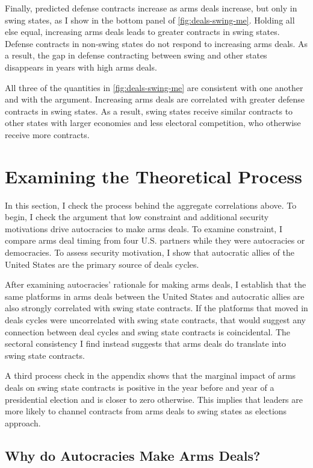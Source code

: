 \documentclass[12pt]{article}
\begin{document}
Finally, predicted defense contracts increase as arms deals increase, but only in swing states, as I show in the bottom panel of \autoref{fig:deals-swing-me}. 
Holding all else equal, increasing arms deals leads to greater contracts in swing states. 
Defense contracts in non-swing states do not respond to increasing arms deals.
As a result, the gap in defense contracting between swing and other states disappears in years with high arms deals. 


All three of the quantities in  \autoref{fig:deals-swing-me} are consistent with one another and with the argument. 
Increasing arms deals are correlated with greater defense contracts in swing states. 
As a result, swing states receive similar contracts to other states with larger economies and less electoral competition, who otherwise receive more contracts.  


\section{Examining the Theoretical Process}


In this section, I check the process behind the aggregate correlations above.  
To begin, I check the argument that low constraint and additional security motivations drive autocracies to make arms deals.
To examine constraint, I compare arms deal timing from four U.S. partners while they were autocracies or democracies.
To assess security motivation, I show that autocratic allies of the United States are the primary source of deals cycles. 


After examining autocracies' rationale for making arms deals, I establish that the same platforms in arms deals between the United States and autocratic allies are also strongly correlated with swing state contracts.
If the platforms that moved in deals cycles were uncorrelated with swing state contracts, that would suggest any connection between deal cycles and swing state contracts is coincidental.
The sectoral consistency I find instead suggests that arms deals do translate into swing state contracts.


A third process check in the appendix shows that the marginal impact of arms deals on swing state contracts is positive in the year before and year of a presidential election and is closer to zero otherwise.
This implies that leaders are more likely to channel contracts from arms deals to swing states as elections approach. 



\subsection{Why do Autocracies Make Arms Deals?}
\end{document}
